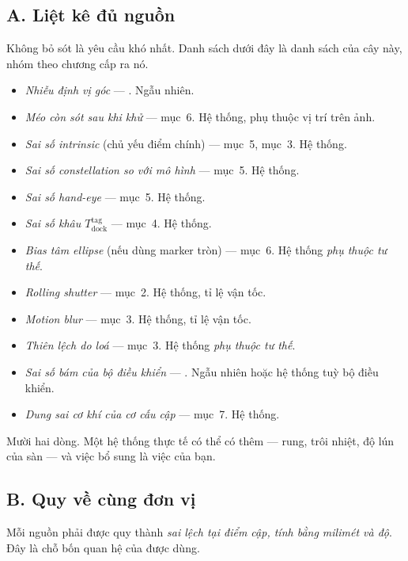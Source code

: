 \documentclass[../../marker.tex]{subfiles}
\begin{document}
\subsection{A. Liệt kê đủ nguồn}

Không bỏ sót là yêu cầu khó nhất. Danh sách dưới đây là danh sách của cây này, nhóm theo chương cấp ra nó.

\begin{itemize}
\item \emph{Nhiễu định vị góc} --- . Ngẫu nhiên.
\item \emph{Méo còn sót sau khi khử} ---  mục~6. Hệ thống, phụ thuộc vị trí trên ảnh.
\item \emph{Sai số intrinsic} (chủ yếu điểm chính) ---  mục~5,  mục~3. Hệ thống.
\item \emph{Sai số constellation so với mô hình} ---  mục~5. Hệ thống.
\item \emph{Sai số hand-eye} ---  mục~5. Hệ thống.
\item \emph{Sai số khâu \(T^{\text{tag}}_{\text{dock}}\)} ---  mục~4. Hệ thống.
\item \emph{Bias tâm ellipse} (nếu dùng marker tròn) ---  mục~6. Hệ thống \emph{phụ thuộc tư thế}.
\item \emph{Rolling shutter} ---  mục~2. Hệ thống, tỉ lệ vận tốc.
\item \emph{Motion blur} ---  mục~3. Hệ thống, tỉ lệ vận tốc.
\item \emph{Thiên lệch do loá} ---  mục~3. Hệ thống \emph{phụ thuộc tư thế}.
\item \emph{Sai số bám của bộ điều khiển} --- . Ngẫu nhiên hoặc hệ thống tuỳ bộ điều khiển.
\item \emph{Dung sai cơ khí của cơ cấu cập} ---  mục~7. Hệ thống.
\end{itemize}

Mười hai dòng. Một hệ thống thực tế có thể có thêm --- rung, trôi nhiệt, độ lún của sàn --- và việc bổ sung là việc của bạn.

\subsection{B. Quy về cùng đơn vị}

Mỗi nguồn phải được quy thành \emph{sai lệch tại điểm cập, tính bằng milimét và độ}. Đây là chỗ bốn quan hệ của  được dùng.
\end{document}
